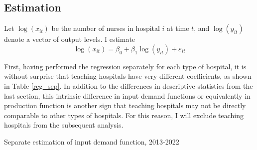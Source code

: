 \documentclass[12pt]{article}
\begin{document}
\subsection{Estimation}

Let $\log(x_{it})$ be the number of nurses in hospital $i$ at time $t$, and
$\log(y_{it})$ denote a vector of output levels. I estimate
\begin{equation}
    \log(x_{it}) = \beta_0 + \beta_1 \log(y_{it}) + \varepsilon_{it}
\end{equation}

First, having performed the regression separately for each type of hospital, it
is without surprise that teaching hospitals have very different coefficients,
as shown in Table \ref{reg_sep}. In addition to the differences in descriptive
statistics from the last section, this intrinsic difference in input demand
functions or equivalently in production function is another sign that teaching
hospitals may not be directly comparable to other types of hospitals. For this
reason, I will exclude teaching hospitals from the subsequent analysis.

\begin{table}\label{tab:reg_sep}
    \centering
    
    \caption{Separate estimation of input demand function, 2013-2022}
\end{table}




%     

%     
\end{document}
